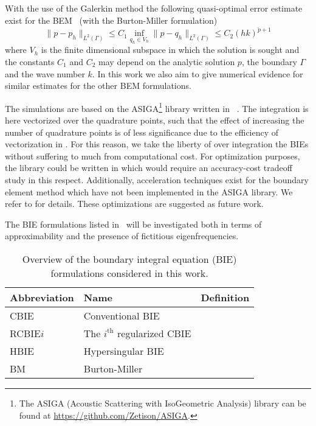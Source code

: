 With the use of the Galerkin method the following quasi-optimal error estimate exist for the BEM~\cite[Theorem 2.49]{Chandler_Wilde2012nab} (with the Burton-Miller formulation)
\begin{equation}\label{Eq3:aprioriErrorEstimate}
	\|p-p_h\|_{L^2(\Gamma)} \leq C_1 \inf_{q_h\in V_h}\|p-q_h\|_{L^2(\Gamma)} \leq C_2 (hk)^{\check{p}+1}
\end{equation}
where $V_h$ is the finite dimensional subspace in which the solution is sought and the constants $C_1$ and $C_2$ may depend on the analytic solution $p$, the boundary $\Gamma$ and the wave number $k$. In this work we also aim to give numerical evidence for similar estimates for the other BEM formulations.

The simulations are based on the ASIGA\footnote{The ASIGA (Acoustic Scattering with IsoGeometric Analysis) library can be found at \href{https://github.com/Zetison/ASIGA}{https://github.com/Zetison/ASIGA}.} library written in \MATLAB~\cite{MatlabR2019a}. The integration is here vectorized over the quadrature points, such that the effect of increasing the number of quadrature points is of less significance due to the efficiency of vectorization in \MATLAB. For this reason, we take the liberty of over integration the BIEs without suffering to much from computational cost. For optimization purposes, the library could be written in \ccpp which would require an accuracy-cost tradeoff study in this respect. Additionally, acceleration techniques exist for the boundary element method which have not been implemented in the ASIGA library. We refer to \cite{Dolz2016aib,Dolz2018afi,Beer2008tbe} for details. These optimizations are suggested as future work.

The BIE formulations listed in~ will be investigated both in terms of approximability and the presence of fictitious eigenfrequencies.
\begin{table}
	\centering
	\caption{Overview of the boundary integral equation (BIE) formulations considered in this work.}
	\label{Tab3:BIEs}
	\begin{tabular}{l l l}
		\toprule
		Abbreviation & Name & Definition\\
		\hline
		CBIE & Conventional BIE & \Cref{Eq3:CBIE}\\
		RCBIE$i$ & The $i^{\mathrm{th}}$ regularized CBIE & \Cref{Eq3:RCBIE1,Eq3:RCBIE2,Eq3:RCBIE3}\\
		HBIE & Hypersingular BIE & \Cref{Eq3:HBIE}\\
		BM & Burton-Miller & \Cref{Eq3:BM}\\
		\bottomrule
	\end{tabular}
\end{table}

